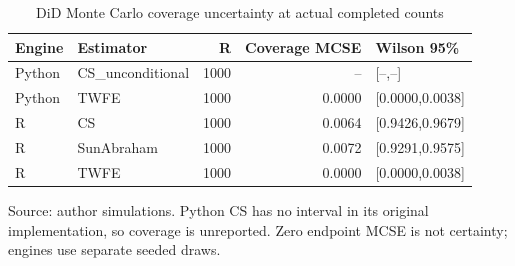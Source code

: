 \begin{table}[htbp]
\centering
\footnotesize
\caption{DiD Monte Carlo coverage uncertainty at actual completed counts}
\begin{tabularx}{\linewidth}{Xlr rX}
\toprule
Engine & Estimator & R & Coverage MCSE & Wilson 95\% \\
\midrule
Python & CS\_\allowbreak{}unconditional & 1000 & -- & [--,--] \\
Python & TWFE & 1000 & 0.0000 & [0.0000,0.0038] \\
R & CS & 1000 & 0.0064 & [0.9426,0.9679] \\
R & SunAbraham & 1000 & 0.0072 & [0.9291,0.9575] \\
R & TWFE & 1000 & 0.0000 & [0.0000,0.0038] \\
\bottomrule
\end{tabularx}
\par\vspace{3pt}\begin{minipage}{\linewidth}\footnotesize Source: author simulations.\allowbreak{} Python CS has no interval in its original implementation, so coverage is unreported.\allowbreak{} Zero endpoint MCSE is not certainty; engines use separate seeded draws.\allowbreak{}\end{minipage}
\end{table}
